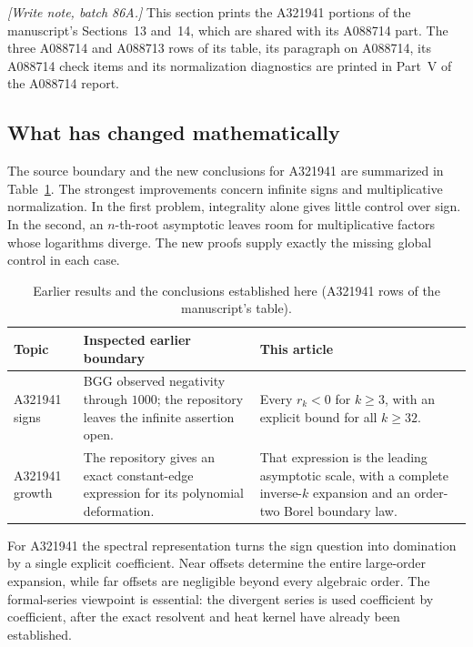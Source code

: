 \documentclass[11pt,a4paper]{article}
\numberwithin{equation}{section}
\theoremstyle{definition}
\theoremstyle{remark}
\theoremstyle{definition}
\begin{document}
\emph{[Write note, batch 86A.]} This section prints the A321941
portions of the manuscript's Sections~13 and~14, which are shared with
its A088714 part. The three A088714 and A088713 rows of its table, its
paragraph on A088714, its A088714 check items and its normalization
diagnostics are printed in Part~V of the A088714 report.

\subsection{What has changed mathematically}

The source boundary and the new conclusions for A321941 are summarized
in Table~\ref{bgg:sg:tab:boundary}.  The strongest improvements concern
infinite signs and multiplicative normalization.  In the first problem,
integrality alone gives little control over sign.  In the second,
an \(n\)-th-root asymptotic leaves room for multiplicative factors
whose logarithms diverge.  The new proofs supply exactly the missing
global control in each case.

\begin{table}[htbp]
\centering\small
\caption{Earlier results and the conclusions established here (A321941
rows of the manuscript's table).}
\label{bgg:sg:tab:boundary}
\begin{tabularx}{\textwidth}{@{}>{\raggedright\arraybackslash}p{23mm}>{\raggedright\arraybackslash}X>{\raggedright\arraybackslash}X@{}}
\toprule
Topic&Inspected earlier boundary&This article\\
\midrule
A321941 signs&
BGG observed negativity through \(1000\); the repository leaves the
infinite assertion open.&
Every \(r_k<0\) for \(k\ge3\), with an explicit bound for all \(k\ge32\).\\[3pt]
A321941 growth&
The repository gives an exact constant-edge expression for its
polynomial deformation.&
That expression is the leading asymptotic scale, with a complete
inverse-\(k\) expansion and an order-two Borel boundary law.\\
\bottomrule
\end{tabularx}
\end{table}

For A321941 the spectral representation turns the sign question into
domination by a single explicit coefficient.  Near offsets determine
the entire large-order expansion, while far offsets are negligible
beyond every algebraic order.  The formal-series viewpoint is essential:
the divergent series is used coefficient by coefficient, after the
exact resolvent and heat kernel have already been established.
\end{document}
